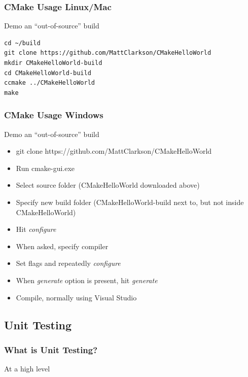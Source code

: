 \subsubsection{CMake Usage Linux/Mac}\label{cmake-usage-linuxmac}

Demo an ``out-of-source'' build

\begin{verbatim}
cd ~/build
git clone https://github.com/MattClarkson/CMakeHelloWorld
mkdir CMakeHelloWorld-build
cd CMakeHelloWorld-build
ccmake ../CMakeHelloWorld
make
\end{verbatim}

\subsubsection{CMake Usage Windows}\label{cmake-usage-windows}

Demo an ``out-of-source'' build

\begin{itemize}
\itemsep1pt\parskip0pt
\item
  git clone https://github.com/MattClarkson/CMakeHelloWorld
\item
  Run cmake-gui.exe
\item
  Select source folder (CMakeHelloWorld downloaded above)
\item
  Specify new build folder (CMakeHelloWorld-build next to, but not
  inside CMakeHelloWorld)
\item
  Hit \emph{configure}
\item
  When asked, specify compiler
\item
  Set flags and repeatedly \emph{configure}
\item
  When \emph{generate} option is present, hit \emph{generate}
\item
  Compile, normally using Visual Studio
\end{itemize}

\subsection{Unit Testing}\label{unit-testing}

\subsubsection{What is Unit Testing?}\label{what-is-unit-testing}

At a high level

